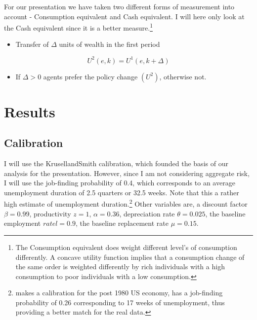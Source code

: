 \documentclass[a4paper,12pt]{article}
\begin{document}
For our presentation we have taken two different forms of measurement into account - Consumption equivalent and Cash equivalent. I will here only look at the Cash equivalent since it is a better measure.\footnote{The Consumption equivalent does weight different level's of consumption differently. A concave utility function implies that a consumption change of the same order is weighted differently by rich individuals with a high consumption to poor individuals with a low consumption.} 

  \begin{itemize}
\item {
  Transfer of $\Delta$ units of wealth in the first period
  }
  \end{itemize}
  
  \begin{equation}
  U^{2}(e,k) = U^{1}(e,k+\Delta) \nonumber
  \end{equation}
  
  \begin{itemize}
  \item {
  If $ \Delta>0 $ agents prefer the policy change $ (U^{2}) $, otherwise not.
  }
  \end{itemize}



\section{Results}

\subsection{Calibration}

I will use the KrusellandSmith calibration, which founded the basis of our analysis for the presentation. However, since I am not considering aggregate risk, I will use the job-finding probability of 0.4, which corresponds to an average unemployment duration of 2.5 quarters or 32.5 weeks. Note that this a rather high estimate of unemployment duration.\footnote{\cite{mukoyama} makes a calibration for the post 1980 US economy, has a job-finding probability of 0.26 corresponding to 17 weeks of unemployment, thus providing a better match for the real data.}
Other variables are, a discount factor $\beta = 0.99$, productivity $z = 1$, $\alpha = 0.36$, depreciation rate $\theta = 0.025$, the baseline employment $rate l=0.9$, the baseline replacement rate $\mu = 0.15$.


\end{document}
